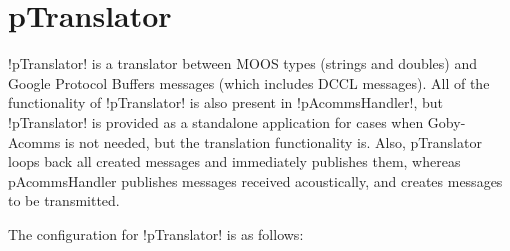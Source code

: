 \section{pTranslator}
\label{sec:ptranslator} 

!pTranslator! is a translator between MOOS types (strings and doubles) and Google Protocol Buffers messages (which includes DCCL messages). All of the functionality of !pTranslator! is also present in !pAcommsHandler!, but !pTranslator! is provided as a standalone application for cases when Goby-Acomms is not needed, but the translation functionality is. Also, pTranslator loops back all created messages and immediately publishes them, whereas pAcommsHandler publishes messages received acoustically, and creates messages to be transmitted.

The configuration for !pTranslator! is as follows:

\resetbvlinenumber

